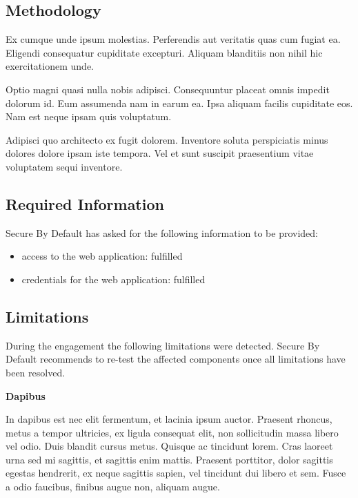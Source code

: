 \documentclass[a4paper]{article}
\def\tightlist{}
\begin{document}
\subsection{Methodology}

Ex cumque unde ipsum molestias.
Perferendis aut veritatis quas cum fugiat ea.
Eligendi consequatur cupiditate excepturi.
Aliquam blanditiis non nihil hic exercitationem unde.

Optio magni quasi nulla nobis adipisci.
Consequuntur placeat omnis impedit dolorum id.
Eum assumenda nam in earum ea.
Ipsa aliquam facilis cupiditate eos.
Nam est neque ipsam quis voluptatum.

Adipisci quo architecto ex fugit dolorem.
Inventore soluta perspiciatis minus dolores dolore ipsam iste tempora.
Vel et sunt suscipit praesentium vitae voluptatem sequi inventore.

  \subsection{Required Information}

  Secure By Default has asked for the following information to be provided:

  \begin{itemize}
\tightlist
\item
  access to the web application: fulfilled
\item
  credentials for the web application: fulfilled
\end{itemize}



  \subsection{Limitations}

  During the engagement the following limitations were detected.
  Secure By Default recommends to re-test the affected components once all limitations have been resolved.

  \textbf{Dapibus}

In dapibus est nec elit fermentum, et lacinia ipsum auctor.
Praesent rhoncus, metus a tempor ultricies, ex ligula consequat elit, non sollicitudin massa libero vel odio.
Duis blandit cursus metus.
Quisque ac tincidunt lorem.
Cras laoreet urna sed mi sagittis, et sagittis enim mattis.
Praesent porttitor, dolor sagittis egestas hendrerit, ex neque sagittis sapien, vel tincidunt dui libero et sem.
Fusce a odio faucibus, finibus augue non, aliquam augue.
\end{document}
